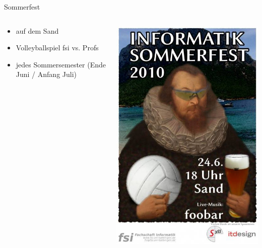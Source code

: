 \documentclass{beamer}
\begin{document}
	\begin{frame}{Sommerfest}
		\begin{columns}
			\begin{column}{.5\linewidth}
				\begin{itemize}
					\item auf dem Sand
					\item Volleyballspiel fsi vs. Profs
					\item jedes Sommersemester (Ende Juni / Anfang Juli)
				\end{itemize}
			\end{column}
			\begin{column}{.5\linewidth}
				\includegraphics[width=\linewidth]{sf10.png}
			\end{column}
		\end{columns}
	\end{frame}
\end{document}
